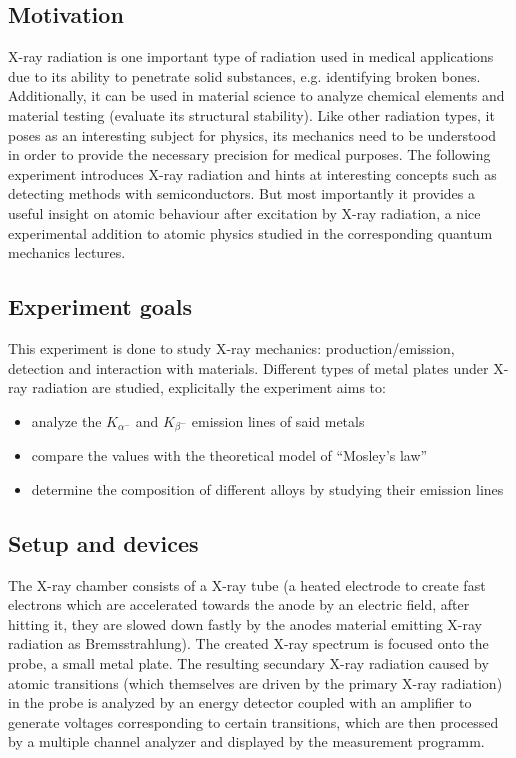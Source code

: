 \subsection{Motivation}
X-ray radiation is one important type of radiation used in medical applications due to its ability to penetrate solid substances, e.g. identifying broken bones. Additionally, it can be used in material science to analyze chemical elements and material testing (evaluate its structural stability). Like other radiation types, it poses as an interesting subject for physics, its mechanics need to be understood in order to provide the necessary precision for medical purposes. The following experiment introduces X-ray radiation and hints at interesting concepts such as detecting methods with semiconductors. But most importantly it provides a useful insight on atomic behaviour after excitation by X-ray radiation, a nice experimental addition to atomic physics studied in the corresponding quantum mechanics lectures.

\subsection{Experiment goals}
This experiment is done to study X-ray mechanics: production/emission, detection and interaction with materials. Different types of metal plates under X-ray radiation are studied, explicitally the experiment aims to:
\begin{itemize}
    \item analyze the \(K_{\alpha^-}\) and \(K_{\beta^-}\) emission lines of said metals 
    \item compare the values with the theoretical model of \enquote{Mosley's law} 
    \item determine the composition of different alloys by studying their emission lines
\end{itemize}

\subsection{Setup and devices}
The X-ray chamber consists of a X-ray tube (a heated electrode to create fast electrons which are accelerated towards the anode by an electric field, after hitting it, they are slowed down fastly by the anodes material emitting X-ray radiation as Bremsstrahlung). The created X-ray spectrum is focused onto the probe, a small metal plate. The resulting secundary X-ray radiation caused by atomic transitions (which themselves are driven by the primary X-ray radiation) in the probe is analyzed by an energy detector coupled with an amplifier to generate voltages corresponding to certain transitions, which are then processed by a multiple channel analyzer and displayed by the measurement programm.


